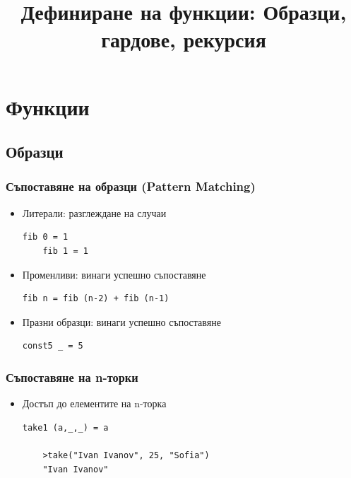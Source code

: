 \documentclass{beamer}
\begin{document}
\title[Функции]{Дефиниране на функции: Образци, гардове, рекурсия}
\frame{\titlepage}

\section{Функции}
\subsection{Образци}


\begin{frame}[fragile]
  \frametitle{Съпоставяне на образци (Pattern Matching)}

\begin{itemize}
  \item Литерали: разглеждане на случаи
  \begin{lstlisting}[basicstyle=\small]
    fib 0 = 1
    fib 1 = 1 
  \end{lstlisting}
  \item Променливи: винаги успешно съпоставяне
  \begin{lstlisting}[basicstyle=\small]
    fib n = fib (n-2) + fib (n-1)
  \end{lstlisting}
  \item Празни образци: винаги успешно съпоставяне
  \begin{lstlisting}[basicstyle=\small]
    const5 _ = 5
  \end{lstlisting}
\end{itemize}

\end{frame}


\begin{frame}[fragile]
  \frametitle{Съпоставяне на n-торки}

\begin{itemize}
  \item Достъп до елементите на n-торка
  \begin{lstlisting}[basicstyle=\small]
    take1 (a,_,_) = a

    >take("Ivan Ivanov", 25, "Sofia")
    "Ivan Ivanov"
  \end{lstlisting}
\end{itemize}

\end{frame}
\end{document}
